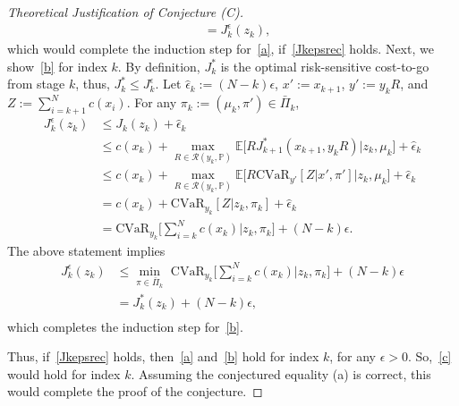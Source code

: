 \documentclass[letterpaper, 10 pt, conference]{ieeeconf}  %
\begin{document}
\begin{proof}[Theoretical Justification of Conjecture (C)]
\begin{equation*}
\begin{aligned}
& = J_k^\epsilon(z_k), \end{aligned}\end{equation*}
%
which would complete the induction step for~\eqref{a}, if~\eqref{Jkepsrec} holds.
Next, we show~\eqref{b} for index $k$. By definition, $J_k^*$ is the optimal risk-sensitive cost-to-go from stage $k$, thus, $J_k^* \leq J_k^\epsilon$.
Let $\hat{\epsilon}_k := (N-k)\epsilon$, $x':=x_{k+1}$, $y' := y_kR$, and $Z := \sum_{i=k+1}^N c(x_i)$. For any $\pi_k := (\mu_k, \pi') \in \bar{\Pi}_k$,
%
\begin{equation*}\begin{aligned}
J_k^\epsilon(z_k) & \leq J_k(z_k) + \hat{\epsilon}_k \\
& \leq c(x_k) + {\underset{R \in \mathcal{R}(y_k, \mathbb{P})}\max} \mathbb{E}\big[ RJ_{k+1}^*(x_{k+1},y_kR) \big| z_k, \mu_k \big] + \hat{\epsilon}_k\\
& \leq c(x_k) + {\underset{R \in \mathcal{R}(y_k, \mathbb{P})}\max} \mathbb{E}\big[ R\text{CVaR}_{y'} [Z|x', \pi' ] \big| z_k, \mu_k \big] + \hat{\epsilon}_k\\
& = c(x_k) + \text{CVaR}_{y_k}[Z|z_k, \pi_k] + \hat{\epsilon}_k\\
& = \text{CVaR}_{y_k}\big[\textstyle \sum_{i=k}^N c(x_k)|z_k, \pi_k\big] + (N-k)\epsilon.
\end{aligned}\end{equation*}
%
The above statement implies
%
\begin{equation*}\begin{aligned}
J_k^\epsilon(z_k) & \leq {\underset{\pi \in \bar{\Pi}_k} \min} \text{ CVaR}_{y_k}\big[\textstyle \sum_{i=k}^N c(x_k)|z_k, \pi_k\big] + (N-k)\epsilon \\
& = J_k^*(z_k) + (N-k)\epsilon, \\
\end{aligned}\end{equation*}
%
which completes the induction step for~\eqref{b}. 

Thus, if~\eqref{Jkepsrec} holds, then~\eqref{a} and~\eqref{b} hold for index $k$, for any $\epsilon>0$. So,~\eqref{c} would hold for index $k$. 
Assuming the conjectured equality (a) is correct, this would complete the proof of the conjecture.
\end{proof}
\addtolength{\textheight}{-2cm}   %


\end{document}
